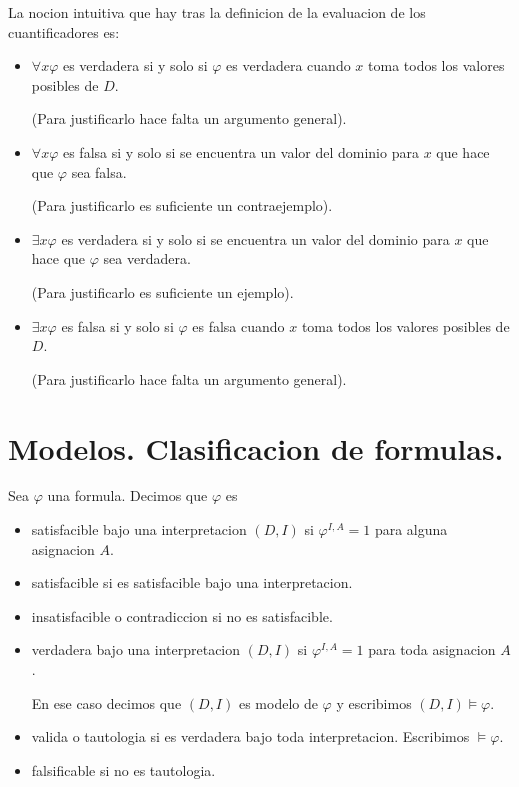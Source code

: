 \begin{remark}
	La nocion intuitiva que hay tras la definicion de la evaluacion de los cuantificadores es:
	\begin{itemize}
		\item \(\forall x \varphi\) es verdadera si y solo si \(\varphi\) es verdadera cuando \(x \) toma todos los valores posibles de \(D \).

		      (Para justificarlo hace falta un argumento general).
		\item \(\forall x \varphi\) es falsa si y solo si se encuentra un valor del dominio para \(x \) que hace que \(\varphi\) sea falsa.

		      (Para justificarlo es suficiente un contraejemplo).

		\item \(\exists x \varphi\) es verdadera si y solo si se encuentra un valor del dominio para \(x \) que hace que \(\varphi\) sea verdadera.

		      (Para justificarlo es suficiente un ejemplo).

		\item \(\exists x \varphi\) es falsa si y solo si \(\varphi\) es falsa cuando \(x \) toma todos los valores posibles de \(D \).

		      (Para justificarlo hace falta un argumento general).
	\end{itemize}
\end{remark}

\vspace{0.4cm}
\section{Modelos. Clasificacion de formulas.}
\begin{definition}
	Sea \(\varphi\) una formula. Decimos que \(\varphi\) es
	\begin{itemize}
		\item satisfacible bajo una interpretacion \((D,I )\) si \(\varphi^{I,A} = 1 \) para alguna asignacion \(A \).
		\item satisfacible si es satisfacible bajo una interpretacion.
		\item insatisfacible o contradiccion si no es satisfacible.
		\item verdadera bajo una interpretacion \((D,I )\) si \(\varphi^{I,A} = 1 \) para toda asignacion \(A \).

		      En ese caso decimos que \((D,I )\) es modelo de \(\varphi\) y escribimos \((D,I ) \vDash \varphi\).
		\item valida o tautologia si es verdadera bajo toda interpretacion. Escribimos \(\vDash \varphi\).
		\item falsificable si no es tautologia.
	\end{itemize}
\end{definition}

